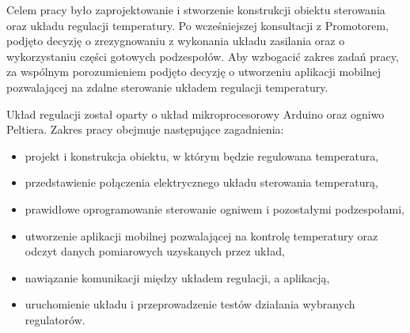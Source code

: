 Celem pracy było zaprojektowanie i stworzenie konstrukcji obiektu sterowania oraz układu regulacji temperatury. Po wcześniejszej konsultacji z Promotorem, podjęto decyzję o zrezygnowaniu z wykonania układu zasilania oraz o wykorzystaniu części gotowych podzespołów. Aby wzbogacić zakres zadań pracy, za wspólnym porozumieniem podjęto decyzję o utworzeniu aplikacji mobilnej pozwalającej na zdalne sterowanie układem regulacji temperatury.

Układ regulacji został oparty o układ mikroprocesorowy Arduino oraz ogniwo Peltiera. Zakres pracy obejmuje następujące zagadnienia:
\begin{itemize}
\item projekt i konstrukcja obiektu, w którym będzie regulowana temperatura,
\item przedstawienie połączenia elektrycznego układu sterowania temperaturą,
\item prawidłowe oprogramowanie sterowanie ogniwem i pozostałymi podzespołami,
\item utworzenie aplikacji mobilnej pozwalającej na kontrolę temperatury oraz odczyt danych pomiarowych uzyskanych przez układ,
\item nawiązanie komunikacji między układem regulacji, a aplikacją,
\item uruchomienie układu i przeprowadzenie testów działania wybranych regulatorów.
\end{itemize}